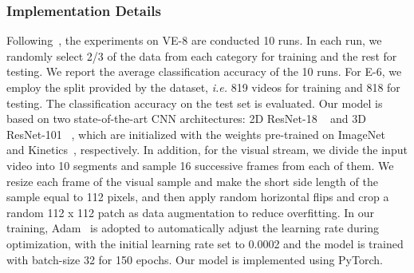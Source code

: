 \documentclass[letterpaper]{article} \usepackage{aaai20}  \usepackage{times}  \usepackage{helvet} \usepackage{courier}  \usepackage[hyphens]{url}  \usepackage{graphicx} \urlstyle{rm} \def\UrlFont{\rm}  \usepackage{graphicx}
\begin{document}
\subsubsection{Implementation Details}
\label{sssec:Details}
Following~\cite{jiang2014predicting,zhang2018recognition}, the experiments on VE-8 are conducted 10 runs. In each run, we randomly select 2/3 of the data from each category for training and the rest for testing. We report the average classification accuracy of the 10 runs. For E-6, we employ the split provided by the dataset, \textit{i.e.} 819 videos for training and 818 for testing. The classification accuracy on the test set is evaluated. Our model is based on two state-of-the-art CNN architectures: 2D ResNet-18 ~\cite{he2016deep} and 3D ResNet-101 ~\cite{hara2018can}, which are initialized with the weights pre-trained on ImageNet~\cite{deng2009imagenet} and Kinetics~\cite{carreira2017quo}, respectively. In addition, for the visual stream, we divide the input video into 10 segments and sample 16 successive frames from each of them. We resize each frame of the visual sample and make the short side length of the sample equal to 112 pixels, and then apply random horizontal flips and crop a random 112 x 112 patch as data augmentation to reduce overfitting. In our training, Adam~\cite{kingma2014adam} is adopted to automatically adjust the learning rate during optimization, with the initial learning rate set to 0.0002 and the model is trained with batch-size 32 for 150 epochs. Our model is implemented using PyTorch.
\end{document}

